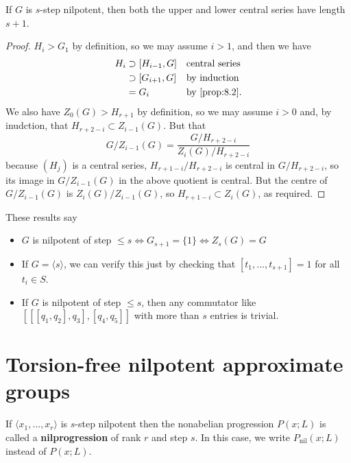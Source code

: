 \documentclass{article}
\newcommand{\named}[1]{\textbf{#1}\index{#1}}
\numberwithin{equation}{section}
\begin{document}
\begin{ncor}\label{cor:8.6}
  If $G$ is $s$-step nilpotent, then both the upper and lower central series have length $s+1$.
\end{ncor}
\begin{proof}
  $H_i > G_1$ by definition, so we may assume $i>1$, and then we have
  \begin{align*}
    H_i &\supset [H_{i-1},G] &&\text{central series} \\
        &\supset [G_{i+1},G] &&\text{by induction} \\
        &=G_i &&\text{by \cref{prop:8.2}}.
  \end{align*}
  We also have $Z_0(G) > H_{r+1}$ by definition, so we may assume $i > 0$ and, by inudction, that $H_{r+2-i} \subset Z_{i-1}(G)$.
  But that
  \begin{equation*}
    G/Z_{i-1}(G) = \frac{G/H_{r+2-i}}{Z_i(G)/H_{r+2-i}}
  \end{equation*}
  because $(H_j)$ is a central series, $H_{r+1-i}/H_{r+2-i}$ is central in $G/H_{r+2-i}$, so its image in $G/Z_{i-1}(G)$ in the above quotient is central.
  But the centre of $G/Z_{i-1}(G)$ is $Z_i(G)/Z_{i-1}(G)$, so $H_{r+1-i} \subset Z_i(G)$, as required.
\end{proof}

These results say
\begin{itemize}
  \item $G$ is nilpotent of step $\leq s \iff G_{s+1} = \{1\} \iff Z_s(G) = G$
  \item If $G = \langle s \rangle$, we can verify this just by checking that $[t_1, \dotsc, t_{s+1}] = 1$ for all $t_i \in S$.
  \item If $G$ is nilpotent of step $\leq s$, then any commutator like $[[[q_1, q_2], q_3], [q_4, q_5]]$ with more than $s$ entries is trivial.
\end{itemize}

\clearpage
\section{Torsion-free nilpotent approximate groups}
\begin{defi}
  If $\langle x_1, \dotsc, x_r \rangle$ is $s$-step nilpotent then the nonabelian progression $P(x;L)$ is called a \named{nilprogression} of rank $r$ and step $s$.
  In this case, we write $P_{\text{nil}}(x;L)$ instead of $P(x;L)$.
\end{defi}

\printindex
\end{document}
